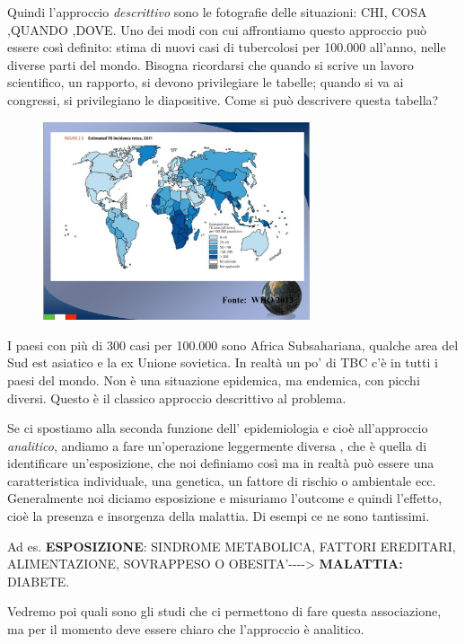 Quindi l'approccio \emph{descrittivo} sono le fotografie delle
situazioni: CHI, COSA ,QUANDO ,DOVE. Uno dei modi con cui affrontiamo
questo approccio può essere così definito: stima di nuovi casi di
tubercolosi per 100.000 all'anno, nelle diverse parti del mondo. Bisogna
ricordarsi che quando si scrive un lavoro scientifico, un rapporto, si
devono privilegiare le tabelle; quando si va ai congressi, si
privilegiano le diapositive. Come si può descrivere questa tabella?


\begin{figure}[!ht]
\centering
	\includegraphics[width=0.7\textwidth]{03/image1.png}
\end{figure}

I paesi con più di 300 casi per 100.000 sono Africa Subsahariana,
qualche area del Sud est asiatico e la ex Unione sovietica. In realtà un
po' di TBC c'è in tutti i paesi del mondo. Non è una situazione
epidemica, ma endemica, con picchi diversi. Questo è il classico
approccio descrittivo al problema.

Se ci spostiamo alla seconda funzione dell' epidemiologia e cioè
all'approccio \emph{analitico}, andiamo a fare un'operazione leggermente
diversa , che è quella di identificare un'esposizione, che noi definiamo
così ma in realtà può essere una caratteristica individuale, una
genetica, un fattore di rischio o ambientale ecc. Generalmente noi
diciamo esposizione e misuriamo l'outcome e quindi l'effetto, cioè la
presenza e insorgenza della malattia. Di esempi ce ne sono tantissimi.

Ad es. \textbf{ESPOSIZIONE}: SINDROME METABOLICA, FATTORI EREDITARI,
ALIMENTAZIONE, SOVRAPPESO O OBESITA'-\/-\/-\/-\textgreater{}
\textbf{MALATTIA:} DIABETE.

Vedremo poi quali sono gli studi che ci permettono di fare questa
associazione, ma per il momento deve essere chiaro che l'approccio è
analitico.

